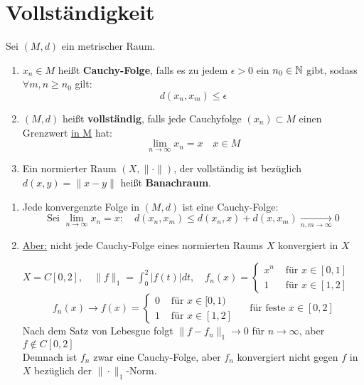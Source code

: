 
\chapter{Vollst{\"a}ndigkeit}

\begin{definition}
	Sei $(M, d)$ ein metrischer Raum.
	\begin{enumerate}[label=\alph*\upshape)]   
		\item $x_{n} \in M$ hei{\ss}t \textbf{Cauchy-Folge}, falls es zu jedem $\epsilon > 0$ ein $n_{0} \in \mathbb{N}$ gibt, sodass $\forall m, n \geq n_{0}$ gilt:
			\[ d(x_{n}, x_{m}) \leq \epsilon \]
		\item $(M, d)$ hei{\ss}t \textbf{vollständig}, falls jede Cauchyfolge $(x_{n}) \subset M$ einen Grenzwert \uline{in M} hat:
			\[ \lim_{n \rightarrow \infty} x_{n} = x \quad x \in M \]
		\item Ein normierter Raum $(X, \| \cdot \|)$, der vollständig ist bezüglich $d(x, y) = \| x - y \|$ heißt \textbf{Banachraum}.
	\end{enumerate}
\end{definition}

\begin{bemerkung}
	\begin{enumerate}[label=\alph*\upshape)]
		\item Jede konvergenzte Folge in $(M, d)$ ist eine Cauchy-Folge:
			\[ \text{Sei } \lim_{n \rightarrow \infty} x_{n} = x: \quad d(x_{n}, x_{m}) \leq d(x_{n}, x) + d(x, x_{m}) \xrightarrow[n, m \rightarrow \infty]{} 0 \]
		\item \uline{Aber:} nicht jede Cauchy-Folge eines normierten Raums $X$ konvergiert in $X$
			\begin{beispiel*}
				$X = C[0, 2], \quad \| f \|_{1} = \int_{0}^{2} | f(t) | dt, \quad
				f_{n}(x) = \begin{cases}x^{n} & \text{ für } x \in [0, 1] \\ 1 & \text{ für } x \in [1, 2]\end{cases}$	
				\[ f_{n}(x) \rightarrow f(x) = \begin{cases} 0 & \text{ für } x \in [0, 1) \\ 1 & \text{ für } x \in [1, 2] \end{cases} \quad \text{ für feste } x \in [0, 2] \]
				Nach dem Satz von Lebesgue folgt $\| f - f_{n} \|_{1} \rightarrow 0$ für $n \rightarrow \infty$, aber $f \notin C[0, 2]$ \\
				Demnach ist $f_{n}$ zwar eine Cauchy-Folge, aber $f_{n}$ konvergiert nicht gegen $f$ in $X$ bezüglich der $\| \cdot \|_{1}$-Norm.
			\end{beispiel*}
	\end{enumerate}	
\end{bemerkung}

